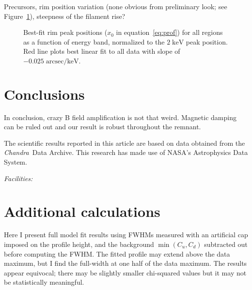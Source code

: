 \documentclass[iop, apj, numberedappendix, twocolappendix]{emulateapj}
\newcommand*{\mt}{\mathrm}
\newcommand*{\unit}[1]{\;\mt{#1}}  %
\newcommand*{\Chandra}{\textit{Chandra}\ }
\begin{document}
Precursors, rim position variation (none obvious from preliminary look; see
Figure~\ref{fig:peak-pos}), steepness of the filament rise?

\begin{figure}[ht]
    \centering
    \caption{Best-fit rim peak positions ($x_0$ in equation~\eqref{eq:prof})
        for all regions as a function of energy band, normalized to the $2
        \unit{keV}$ peak position.  Red line plots best linear fit to all data
        with slope of $-0.025 \unit{arcsec/keV}$.
        \label{fig:peak-pos}}
\end{figure}

\section{Conclusions}

In conclusion, crazy B field amplification is not that weird.
Magnetic damping can be ruled out and our result is robust throughout the remnant.

\acknowledgments

The scientific results reported in this article are based on data obtained from
the \Chandra Data Archive.
This research has made use of NASA's Astrophysics Data System.

{\it Facilities:} 

\clearpage

\appendix

\setcounter{table}{0}
\renewcommand{\thetable}{A\arabic{table}}
\setcounter{figure}{0}
\renewcommand{\thefigure}{A\arabic{figure}}

\section{Additional calculations}

Here I present full model fit results using FWHMs measured with an artificial
cap imposed on the profile height, and the background $\min(C_u, C_d)$
subtracted out before computing the FWHM.  The fitted profile may extend above
the data maximum, but I find the full-width at one half of the data maximum.
The results appear equivocal; there may be slightly smaller chi-squared values
but it may not be statistically meaningful.
\end{document}
